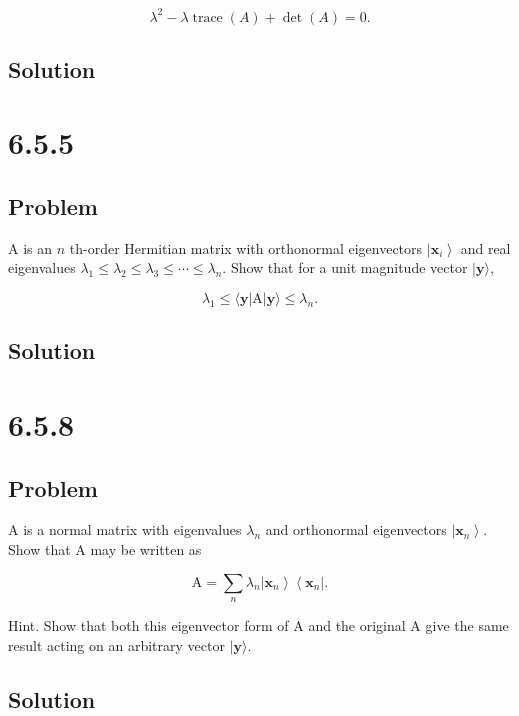 \documentclass[12pt]{article}
\begin{document}
\[
    \lambda^2-\lambda \operatorname{trace}(A)+\operatorname{\det}(A)=0 .
\]

\subsection{Solution}

\newpage
\section{6.5.5}

\subsection{Problem}

\(\mathrm{A}\) is an \(n\) th-order Hermitian matrix with orthonormal eigenvectors \(\left|\mathbf{x}_i\right\rangle \) and real eigenvalues \(\lambda_1 \leq \lambda_2 \leq \lambda_3 \leq \cdots \leq \lambda_n\). Show that for a unit magnitude vector \(|\mathbf{y}\rangle \),

\[
\lambda_1 \leq\langle\mathbf{y}|\mathrm{A}| \mathbf{y}\rangle \leq \lambda_n .
\]

\subsection{Solution}

\newpage
\section{6.5.8}

\subsection{Problem}

\(\mathrm{A}\) is a normal matrix with eigenvalues \(\lambda_n\) and orthonormal eigenvectors \(\left|\mathbf{x}_n\right\rangle \). Show that A may be written as

\[
\mathrm{A}=\sum_n \lambda_n\left|\mathbf{x}_n\right\rangle\left\langle\mathbf{x}_n\right| .
\]

Hint. Show that both this eigenvector form of \(\mathrm{A}\) and the original \(\mathrm{A}\) give the same result acting on an arbitrary vector \(|\mathbf{y}\rangle \).

\subsection{Solution}
\end{document}
